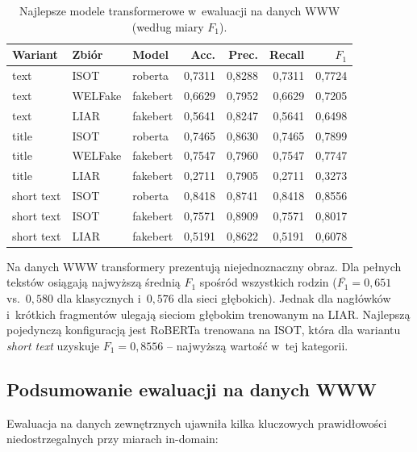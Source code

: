 \documentclass[oneside,polski,logo]{amuthesis}
\begin{document}
\begin{table}[ht]
\centering
\caption{Najlepsze modele transformerowe w~ewaluacji na danych WWW
(według miary $F_1$).}
\label{tab:bert_web}
\begin{tabular}{lllrrrr}
\toprule
Wariant & Zbiór & Model & Acc. & Prec. & Recall & $F_1$ \\
\midrule
text       & ISOT    & roberta    & 0,7311 & 0,8288 & 0,7311 & 0,7724 \\
text       & WELFake & fakebert   & 0,6629 & 0,7952 & 0,6629 & 0,7205 \\
text       & LIAR    & fakebert   & 0,5641 & 0,8247 & 0,5641 & 0,6498 \\
title      & ISOT    & roberta    & 0,7465 & 0,8630 & 0,7465 & 0,7899 \\
title      & WELFake & fakebert   & 0,7547 & 0,7960 & 0,7547 & 0,7747 \\
title      & LIAR    & fakebert   & 0,2711 & 0,7905 & 0,2711 & 0,3273 \\
short text & ISOT    & roberta    & 0,8418 & 0,8741 & 0,8418 & 0,8556 \\
short text & ISOT    & fakebert   & 0,7571 & 0,8909 & 0,7571 & 0,8017 \\
short text & LIAR    & fakebert   & 0,5191 & 0,8622 & 0,5191 & 0,6078 \\
\bottomrule
\end{tabular}
\end{table}

Na danych WWW transformery prezentują niejednoznaczny obraz. Dla pełnych
tekstów osiągają najwyższą średnią \(F_1\) spośród wszystkich rodzin
(\(\overline{F_1} = 0{,}651\) vs.\ \(0{,}580\) dla klasycznych i~\(0{,}576\)
dla sieci głębokich). Jednak dla nagłówków i~krótkich fragmentów ulegają
sieciom głębokim trenowanym na LIAR. Najlepszą pojedynczą konfiguracją
jest RoBERTa trenowana na ISOT, która dla wariantu \emph{short text}
uzyskuje \(F_1 = 0{,}8556\) -- najwyższą wartość w~tej kategorii.

\subsection{Podsumowanie ewaluacji na danych WWW}
\label{sec:wyniki_www_podsum}

Ewaluacja na danych zewnętrznych ujawniła kilka kluczowych
prawidłowości niedostrzegalnych przy miarach in-domain:
\end{document}
